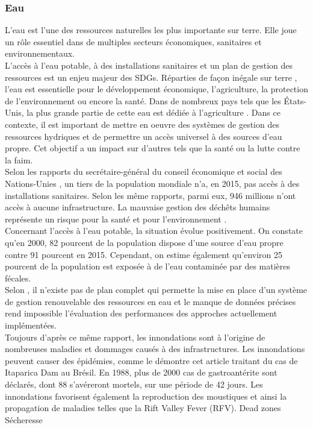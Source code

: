 \documentclass[10pt, conference, compsocconf]{llncs}
\begin{document}
\subsubsection{Eau}
L'eau est l'une des ressources naturelles les plus importante sur terre. Elle joue un rôle essentiel dans de multiples secteurs économiques, sanitaires et environnementaux.\\
L'accès à l'eau potable, à des installations sanitaires et un plan de gestion des ressources est un enjeu majeur des SDGs. Réparties de façon inégale sur terre \cite{lefevre_repartition_nodate}, l'eau est essentielle pour le développement économique, l'agriculture, la protection de l'environnement ou encore la santé. Dans de nombreux pays tels que les États-Unis, la plus grande partie de cette eau est dédiée à l'agriculture \cite{gwt_global_nodate}. Dans ce contexte, il est important de mettre en oeuvre des systèmes de gestion des ressources hydriques et de permettre un accès universel à des sources d'eau propre. Cet objectif a un impact sur d'autres tels que la santé ou la lutte contre la faim.\\
Selon les rapports du secrétaire-général du conseil économique et social des Nations-Unies \cite{united_nations_economic_and_social_council_progress_2017}\cite{united_nations_economic_and_social_council_progress_2017-1}, un tiers de la population mondiale n'a, en 2015, pas accès à des installations sanitaires. Selon les même rapports, parmi eux, 946 millions n'ont accès à aucune infrastructure. La mauvaise gestion des déchêts humains représente un risque pour la santé et pour l'environnement \cite{ashbolt_microbial_2004}.\\
Concernant l'accès à l'eau potable, la situation évolue positivement. On constate qu'en 2000, 82 pourcent de la population dispose d'une source d'eau propre contre 91 pourcent en 2015. Cependant, on estime également qu'environ 25 pourcent de la population est exposée à de l'eau contaminée par des matières fécales\cite{united_nations_goal_nodate-4}. \\
Selon \cite{rana_water_2017}, il n'existe pas de plan complet qui permette la mise en place d'un système de gestion renouvelable des ressources en eau et le manque de données précises rend impossible l'évaluation des performances des approches actuellement implémentées. \\
Toujours d'après ce même rapport, les innondations sont à l'origine de nombreuses maladies et dommages causés à des infrastructures. Les innondations peuvent causer des épidémies, comme le démontre cet article \cite{texeira_gastroenteritis_1993} traitant du cas de Itaparica Dam au Brésil. En 1988, plus de 2000 cas de gastroantérite sont déclarés, dont 88 s'avéreront mortels, sur une période de 42 jours. Les innondations favorisent également la reproduction des moustiques et ainsi la propagation de maladies telles que la Rift Valley Fever (RFV)\cite{hanafi_rift_2010}.
Dead zones
Sécheresse
\end{document}
